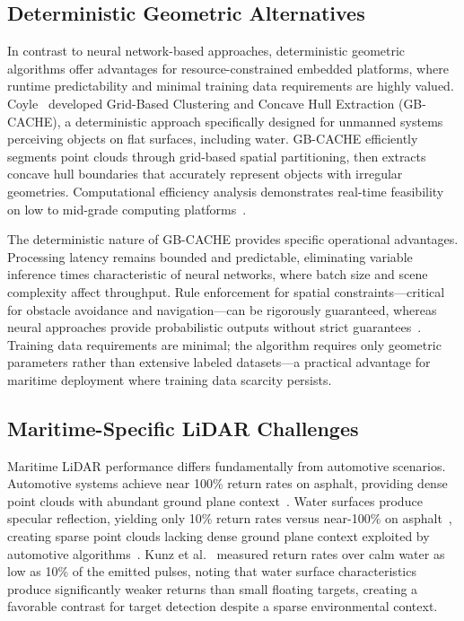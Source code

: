 \documentclass{erauthesis}
\begin{document}
\subsection{Deterministic Geometric Alternatives}

In contrast to neural network-based approaches, deterministic geometric algorithms offer advantages for resource-constrained embedded platforms, where runtime predictability and minimal training data requirements are highly valued.
Coyle~\cite{coyleE} developed Grid-Based Clustering and Concave Hull Extraction (GB-CACHE), a deterministic approach specifically designed for unmanned systems perceiving objects on flat surfaces, including water.
GB-CACHE efficiently segments point clouds through grid-based spatial partitioning, then extracts concave hull boundaries that accurately represent objects with irregular geometries.
Computational efficiency analysis demonstrates real-time feasibility on low to mid-grade computing platforms~\cite{coyleE}.

The deterministic nature of GB-CACHE provides specific operational advantages.
Processing latency remains bounded and predictable, eliminating variable inference times characteristic of neural networks, where batch size and scene complexity affect throughput.
Rule enforcement for spatial constraints—critical for obstacle avoidance and navigation—can be rigorously guaranteed, whereas neural approaches provide probabilistic outputs without strict guarantees~\cite{coyleE}.
Training data requirements are minimal; the algorithm requires only geometric parameters rather than extensive labeled datasets—a practical advantage for maritime deployment where training data scarcity persists.

\subsection{Maritime-Specific LiDAR Challenges}

Maritime \ac{LiDAR} performance differs fundamentally from automotive scenarios.
Automotive systems achieve near 100\% return rates on asphalt, providing dense point clouds with abundant ground plane context~\cite{roriz2022}.
Water surfaces produce specular reflection, yielding only 10\% return rates versus near-100\% on asphalt~\cite{kunz2005, roriz2022}, creating sparse point clouds lacking dense ground plane context exploited by automotive algorithms~\cite{zhou2018, shi2019}.
Kunz et al.~\cite{kunz2005} measured return rates over calm water as low as 10\% of the emitted pulses, noting that water surface characteristics produce significantly weaker returns than small floating targets, creating a favorable contrast for target detection despite a sparse environmental context.
\end{document}
